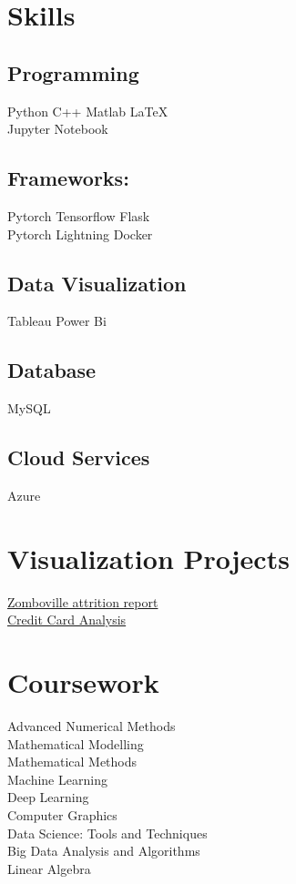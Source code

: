 \documentclass[]{deedy-resume-openfont}
\begin{document}
%
%
\begin{minipage}[t]{0.33\textwidth}






\section{Skills}
\subsection{Programming}
Python \textbullet{} C++ \textbullet{} Matlab \textbullet{} \LaTeX  \\
\textbullet{} Jupyter Notebook  
\subsection{Frameworks:}
Pytorch \textbullet{} Tensorflow \textbullet{} Flask\\
\textbullet{} Pytorch Lightning  \textbullet{} Docker
\subsection{Data Visualization}
Tableau \textbullet{} Power Bi 
\subsection{Database}
MySQL
\subsection{Cloud Services}
Azure
\sectionsep


\section{Visualization Projects}
\textbullet{} \href{https://github.com/Shyam-Sundar-7/hr_tableau_dashboard}{Zomboville attrition report} \\
\textbullet{}\href{https://github.com/Shyam-Sundar-7/credit-card-analysis---tableau}{Credit Card Analysis}
\sectionsep


\section{Coursework}
\textbullet{}Advanced Numerical Methods \\
\textbullet{}Mathematical Modelling \\
\textbullet{}Mathematical Methods \\
\textbullet{}Machine Learning \\\textbullet{}
Deep Learning \\\textbullet{}
Computer Graphics \\\textbullet{}
Data Science: Tools and Techniques \\\textbullet{}
Big Data Analysis and Algorithms\\\textbullet{}
Linear Algebra 
\sectionsep


\end{minipage}
\end{document}
